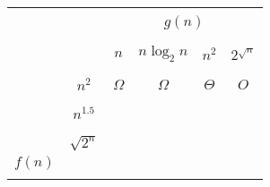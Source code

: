 \documentclass[12pt,twoside]{article}
\begin{document}
\begin{problem}{20}
\else
\begin{center}
\begin{tabular}{|c|c||c|c|c|c|}
\cline{3-6}
\multicolumn{2}{c||}{} & \multicolumn{4}{c|}{} \\
\multicolumn{2}{c||}{} & \multicolumn{4}{c|}{$g(n)$} \\
\multicolumn{2}{c||}{} & \multicolumn{4}{c|}{} \\
\cline{3-6}
\multicolumn{2}{c||}{}
                   & \hspace*{1.0in} & \hspace*{1.0in} & \hspace*{1.0in} & \hspace*{1.0in}\\
\multicolumn{2}{c||}{}
                   &       $n$       &  $n \log_2 n$     &      $n^2$   &   $2^{\sqrt{n}}$ \\
\multicolumn{2}{c||}{}
                   &                 &                 &             &    \\
\hline
\hline
\hspace*{0.5in}
&                    & \hspace*{1.0in} & \hspace*{1.0in} & \hspace*{1.0in} & \\
& $n^2$               & \large $\Omega$   & \large $\Omega$   & \large $\Theta$ & $O$ \\
&                    &                 &                 &             &   \\
\cline{2-6}
&                    & \hspace*{1.0in} & \hspace*{1.0in} & \hspace*{1.0in}&\\
& $n^{1.5}$           &                 &                 &        &        \\
&                    &                 &                 &             &   \\
\cline{2-6}
&                    & \hspace*{1.0in} & \hspace*{1.0in} & \hspace*{1.0in} &\\
& $\sqrt{2^n}$         &                 &                 &       &         \\
$f(n)$
&                    &                 &                 &             &   \\
\cline{2-6}
&                    & \hspace*{1.0in} & \hspace*{1.0in} & \hspace*{1.0in} &\\

\end{tabular}
\end{center}
\end{problem}
\end{document}
